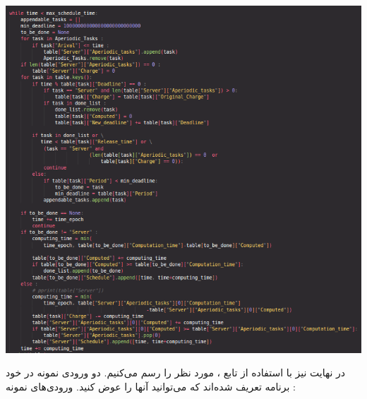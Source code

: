 \begin{center}
  \includegraphics[scale=0.5]{pics/main.png}
\end{center}

در نهایت نیز با استفاده از تابع 
،
مورد نظر را رسم می‌کنیم.
دو ورودی نمونه در خود برنامه تعریف شده‌اند که 
می‌توانید آنها را عوض کنید. 
ورودی‌های نمونه : 

